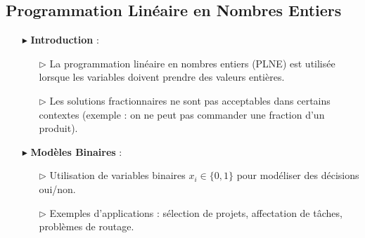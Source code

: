 \documentclass{report}
\begin{document}
\begin{multicols*}{2}
\chapter{Programmation Linéaire en Nombres Entiers}

\begin{itemize}
    \item[$\blacktriangleright$] \textbf{Introduction} :
    \begin{itemize}
        \item[$\rhd$] La programmation linéaire en nombres entiers (PLNE) est utilisée lorsque les variables doivent prendre des valeurs entières.
        \item[$\rhd$] Les solutions fractionnaires ne sont pas acceptables dans certains contextes (exemple : on ne peut pas commander une fraction d'un produit).
    \end{itemize}

    \item[$\blacktriangleright$] \textbf{Modèles Binaires} :
    \begin{itemize}
        \item[$\rhd$] Utilisation de variables binaires \( x_i \in \{0, 1\} \) pour modéliser des décisions oui/non.
        \item[$\rhd$] Exemples d'applications : sélection de projets, affectation de tâches, problèmes de routage.
    \end{itemize}


\end{itemize}
\end{multicols*}
\end{document}
